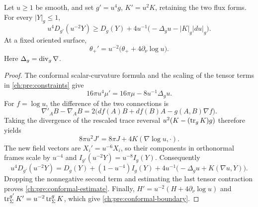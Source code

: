 \begin{lemma}\label{ch:pre:conformal}
Let $u\ge1$ be smooth, and set $g'=u^4g$, $K'=u^2K$, retaining the two flux forms. For every $|Y|_g\le1$,
\begin{equation}\label{ch:pre:conformal-estimate}
 u^4D_{g'}(u^{-2}Y)
 \ge D_g(Y)+4u^{-1}\bigl(-\Delta_gu-|K|_g|du|_g\bigr).
\end{equation}
At a fixed oriented surface,
\begin{equation}\label{ch:pre:conformal-boundary}
 \theta_+'=u^{-2}\bigl(\theta_++4\partial_\nu\log u\bigr).
\end{equation}
Here $\Delta_g=\operatorname{div}_g\nabla$.
\end{lemma}

\begin{proof}
The conformal scalar-curvature formula and the scaling of the tensor terms in \eqref{ch:pre:constraints} give
\[
 16\pi u^4\mu'=16\pi\mu-8u^{-1}\Delta_gu.
\]
For $f=\log u$, the difference of the two connections is
\[
 \nabla'_AB-\nabla_AB
 =2\bigl(df(A)B+df(B)A-g(A,B)\nabla f\bigr).
\]
Taking the divergence of the rescaled trace reversal
$u^2(K-(\operatorname{tr}_gK)g)$ therefore yields
\[
 8\pi u^2J'=8\pi J+4K(\nabla\log u,\cdot).
\]
The new field vectors are $X_i'=u^{-6}X_i$, so their components in orthonormal frames scale by $u^{-4}$ and
$I_{g'}(u^{-2}Y)=u^{-8}I_g(Y)$. Consequently
\[
 u^4D_{g'}(u^{-2}Y)
 =D_g(Y)+(1-u^{-4})I_g(Y)
 +4u^{-1}\bigl(-\Delta_gu+K(\nabla u,Y)\bigr).
\]
Dropping the nonnegative second term and estimating the last tensor contraction proves \eqref{ch:pre:conformal-estimate}. Finally,
$H'=u^{-2}(H+4\partial_\nu\log u)$ and
$\operatorname{tr}_\Sigma^{g'}K'=u^{-2}\operatorname{tr}_\Sigma^gK$, which give \eqref{ch:pre:conformal-boundary}.
\end{proof}
